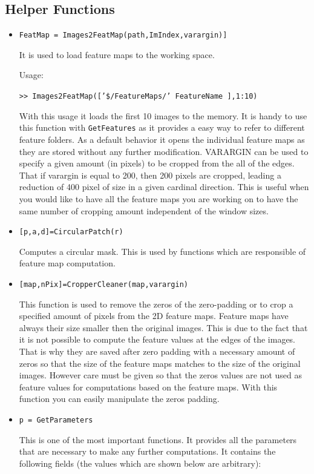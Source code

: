 \documentclass[a4paper,10pt]{report}
\begin{document}
\subsection{Helper Functions}
\begin{itemize}
\item \texttt{FeatMap = Images2FeatMap(path,ImIndex,varargin)]}

It is used to load feature maps to the working space. 

Usage: 

	\texttt{>> Images2FeatMap(['\$/FeatureMaps/' FeatureName ],1:10)} 

With this usage it loads the first 10 images to the memory. It is handy to use this function with \texttt{GetFeatures}
as it provides a easy way to refer to different feature folders.
As a default behavior it opens the individual feature maps as they are stored without any further modification. VARARGIN can be used to specify a given amount (in pixels) to be cropped from the all of the edges. That if varargin is equal to 200, then 200 pixels are cropped, leading a reduction of 400 pixel of size in a given cardinal direction. This is useful when you would like to have all the feature maps you are working on to have the same number of cropping amount independent of the window sizes.


 \item \texttt{[p,a,d]=CircularPatch(r)}

Computes a circular mask. This is used by functions which are responsible of feature map computation.

 \item \texttt{[map,nPix]=CropperCleaner(map,varargin)}

This function is used to remove the zeros of the zero-padding or to crop a specified amount of pixels from the 2D feature maps. Feature maps have always their size smaller then the original images. This is due to the fact that it is not possible to compute the feature values at the edges of the images. That is why they are saved after zero padding with a necessary amount of zeros so that the size of the feature maps matches to the size of the original images. However care must be given so that the zeros values are not used as feature values for computations based on the feature maps. With this function you can easily manipulate the zeros padding. 


 \item \texttt{p = GetParameters}

	This is one of the most important functions. It provides all the parameters that are necessary to make any further computations. It contains the following fields (the values which are shown below are arbitrary): 
	

\end{itemize}
\end{document}
